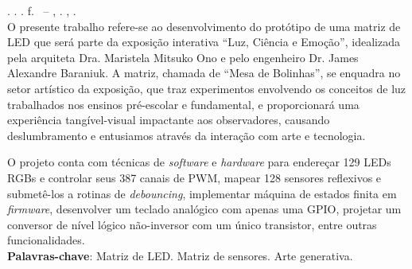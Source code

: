 
\begin{resumo}[RESUMO]
\begin{SingleSpacing}

\imprimirautorcitacao. \imprimirtitulo. \imprimirdata. \pageref {LastPage} f. \imprimirprojeto\ – \imprimirprograma, \imprimirinstituicao. \imprimirlocal, \imprimirdata.\\

O presente trabalho refere-se ao desenvolvimento do protótipo de uma matriz de LED que será parte da exposição interativa ``Luz, Ciência e Emoção'', idealizada pela arquiteta Dra. Maristela Mitsuko Ono e pelo engenheiro Dr. James Alexandre Baraniuk. A matriz, chamada de ``Mesa de Bolinhas'', se enquadra no setor artístico da exposição, que traz experimentos envolvendo os conceitos de luz trabalhados nos ensinos pré-escolar e fundamental, e proporcionará uma experiência tangível-visual impactante aos observadores, causando deslumbramento e entusiamos através da interação com arte e tecnologia.

O projeto conta com técnicas de \emph{software} e \emph{hardware} para endereçar 129 LEDs RGBs e controlar seus 387 canais de PWM, mapear 128 sensores reflexivos e submetê-los a rotinas de \emph{debouncing}, implementar máquina de estados finita em \emph{firmware}, desenvolver um teclado analógico com apenas uma GPIO, projetar um conversor de nível lógico não-inversor com um único transistor, entre outras funcionalidades.\\

\textbf{Palavras-chave}: Matriz de LED. Matriz de sensores. Arte generativa.

\end{SingleSpacing}
\end{resumo}


